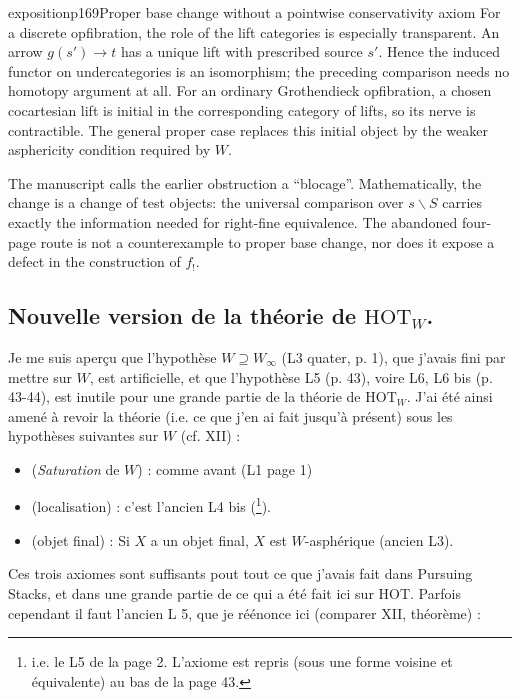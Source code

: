 \begin{dcomment}{exposition}{p169}{Proper base change without a pointwise conservativity axiom}
For a discrete opfibration, the role of the lift categories is especially transparent. An arrow $g(s')\to t$ has a unique lift with prescribed source $s'$. Hence the induced functor on undercategories is an isomorphism; the preceding comparison needs no homotopy argument at all. For an ordinary Grothendieck opfibration, a chosen cocartesian lift is initial in the corresponding category of lifts, so its nerve is contractible. The general proper case replaces this initial object by the weaker asphericity condition required by $W$.

The manuscript calls the earlier obstruction a ``blocage''. Mathematically, the change is a change of test objects: the universal comparison over $s\backslash S$ carries exactly the information needed for right-fine equivalence. The abandoned four-page route is not a counterexample to proper base change, nor does it expose a defect in the construction of $f_!$.
\end{dcomment}


\subsection*{Nouvelle version de la théorie de $\mathrm{HOT}_W$.}

Je me suis aperçu que l'hypothèse $W \supseteq W_\infty$ (L3 quater, p. 1), que j'avais fini par mettre sur $W$, est artificielle, et que l'hypothèse L5 (p. 43), voire L6, L6 bis (p. 43-44), est inutile pour une grande partie de la théorie de $\mathrm{HOT}_W$. J'ai été ainsi amené à revoir la théorie (i.e. ce que j'en ai fait jusqu'à présent) sous les hypothèses suivantes sur $W$ (cf. XII) :

\begin{itemize}[leftmargin=4em]
\item[W(1)] (\textit{Saturation} de $W$) : comme avant (L1 page 1)
\item[W(2)] (localisation) : c'est l'ancien L4 bis (\footnote{i.e. le L5 de la page 2. L'axiome est repris (sous une forme voisine et équivalente) au bas de la page 43.}).
\item[W(3)] (objet final) : Si $X$ a un objet final, $X$ est $W$-asphérique (ancien L3).
\end{itemize}

Ces trois axiomes sont suffisants pout tout ce que j'avais fait dans Pursuing Stacks, et dans une grande partie de ce qui a été fait ici sur HOT. Parfois cependant il faut l'ancien L 5, que je réénonce ici (comparer XII, théorème) : %

